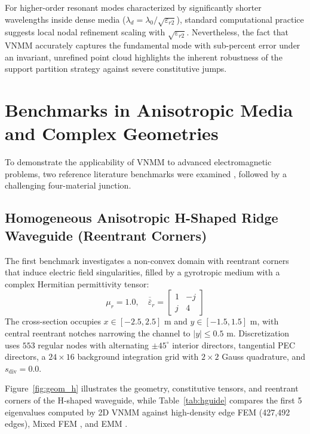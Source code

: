 \documentclass[11pt,a4paper]{article}
\begin{document}
For higher-order resonant modes characterized by significantly shorter wavelengths inside dense media ($\lambda_d = \lambda_0 / \sqrt{\varepsilon_{r2}}$), standard computational practice suggests local nodal refinement scaling with $\sqrt{\varepsilon_{r2}}$. Nevertheless, the fact that VNMM accurately captures the fundamental mode with sub-percent error under an invariant, unrefined point cloud highlights the inherent robustness of the support partition strategy against severe constitutive jumps.

\section{Benchmarks in Anisotropic Media and Complex Geometries}

To demonstrate the applicability of VNMM to advanced electromagnetic problems, two reference literature benchmarks were examined \cite{ortiz2023,jiang2014}, followed by a challenging four-material junction.

\subsection{Homogeneous Anisotropic H-Shaped Ridge Waveguide (Reentrant Corners)}
The first benchmark investigates a non-convex domain with reentrant corners that induce electric field singularities, filled by a gyrotropic medium with a complex Hermitian permittivity tensor:
\begin{equation}
\mu_r = 1.0, \quad \overline{\overline{\varepsilon}}_r = \begin{bmatrix} 1 & -j \\ j & 4 \end{bmatrix}
\end{equation}
The cross-section occupies $x \in [-2.5, 2.5]\text{ m}$ and $y \in [-1.5, 1.5]\text{ m}$, with central reentrant notches narrowing the channel to $|y| \le 0.5\text{ m}$. Discretization uses $553$ regular nodes with alternating $\pm 45^\circ$ interior directors, tangential PEC directors, a $24 \times 16$ background integration grid with $2 \times 2$ Gauss quadrature, and $s_{\mathrm{div}} = 0.0$.

Figure~\ref{fig:geom_h} illustrates the geometry, constitutive tensors, and reentrant corners of the H-shaped waveguide, while Table~\ref{tab:hguide} compares the first 5 eigenvalues computed by 2D VNMM against high-density edge FEM (427,492 edges), Mixed FEM \cite{jiang2014}, and EMM \cite{lima2017}.
\end{document}
